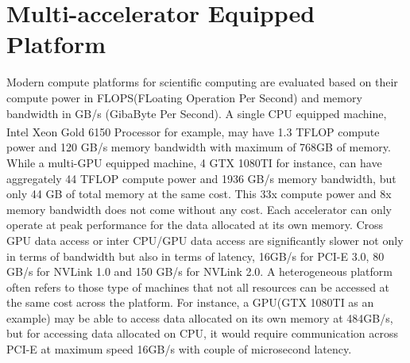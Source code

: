 \section{Multi-accelerator Equipped Platform}
Modern compute platforms for scientific computing are evaluated based on their compute power in FLOPS(FLoating Operation Per Second) and memory bandwidth in GB/s (GibaByte Per Second). A single CPU equipped machine, Intel\textsuperscript{\textregistered} Xeon\textsuperscript{\textregistered} Gold 6150 Processor for example, may have 1.3 TFLOP compute power and 120 GB/s memory bandwidth with maximum of 768GB of memory. While a multi-GPU equipped machine, 4 GTX 1080TI for instance, can have aggregately 44 TFLOP compute power and 1936 GB/s memory bandwidth, but only 44 GB of total memory at the same cost. This 33x compute power and 8x memory bandwidth does not come without any cost. Each accelerator can only operate at peak performance for the data allocated at its own memory. Cross GPU data access or inter CPU/GPU data access are significantly slower not only in terms of bandwidth but also in terms of latency, 16GB/s for PCI-E 3.0, 80 GB/s for NVLink 1.0 and 150 GB/s for NVLink 2.0. A heterogeneous platform often refers to those type of machines that not all resources can be accessed at the same cost across the platform. For instance, a GPU(GTX 1080TI as an example) may be able to access data allocated on its own memory at 484GB/s, but for accessing data allocated on CPU, it would require communication across PCI-E at maximum speed 16GB/s with couple of microsecond latency. 

